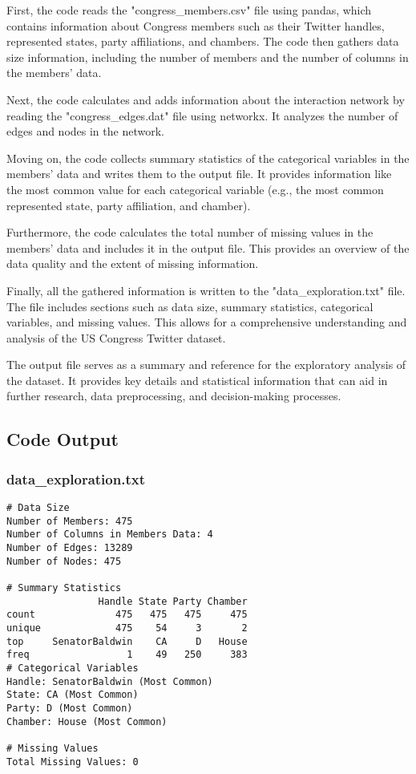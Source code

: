 \documentclass[11pt]{article}
\begin{document}
First, the code reads the "congress\_members.csv" file using pandas, which contains information about Congress members such as their Twitter handles, represented states, party affiliations, and chambers. The code then gathers data size information, including the number of members and the number of columns in the members' data.

Next, the code calculates and adds information about the interaction network by reading the "congress\_edges.dat" file using networkx. It analyzes the number of edges and nodes in the network.

Moving on, the code collects summary statistics of the categorical variables in the members' data and writes them to the output file. It provides information like the most common value for each categorical variable (e.g., the most common represented state, party affiliation, and chamber).

Furthermore, the code calculates the total number of missing values in the members' data and includes it in the output file. This provides an overview of the data quality and the extent of missing information.

Finally, all the gathered information is written to the "data\_exploration.txt" file. The file includes sections such as data size, summary statistics, categorical variables, and missing values. This allows for a comprehensive understanding and analysis of the US Congress Twitter dataset.

The output file serves as a summary and reference for the exploratory analysis of the dataset. It provides key details and statistical information that can aid in further research, data preprocessing, and decision-making processes.

\subsection{Code Output}

\subsubsection*{data\_exploration.txt}

\begin{Verbatim}[tabsize=4]
# Data Size
Number of Members: 475
Number of Columns in Members Data: 4
Number of Edges: 13289
Number of Nodes: 475

# Summary Statistics
                Handle State Party Chamber
count              475   475   475     475
unique             475    54     3       2
top     SenatorBaldwin    CA     D   House
freq                 1    49   250     383
# Categorical Variables
Handle: SenatorBaldwin (Most Common)
State: CA (Most Common)
Party: D (Most Common)
Chamber: House (Most Common)

# Missing Values
Total Missing Values: 0

\end{Verbatim}
\end{document}
